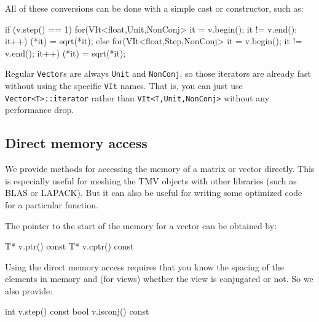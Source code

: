 \documentclass[twoside,letterpaper,11pt]{article}
\renewcommand{\tt}[1]{{\lstinline {#1}}}
\begin{document}
All of these conversions can be done with a simple cast or constructor, such as:
\begin{tmvcode}
if (v.step() == 1) {
    for(VIt<float,Unit,NonConj> it = v.begin(); it != v.end(); it++)
        (*it) = sqrt(*it);
} else {
    for(VIt<float,Step,NonConj> it = v.begin(); it != v.end(); it++)
        (*it) = sqrt(*it);
}
\end{tmvcode}

Regular \tt{Vector}s are always \tt{Unit} and \tt{NonConj}, so those iterators
are already fast without using the specific \tt{VIt} names. 
That is, you can just use \tt{Vector<T>::iterator} rather than \tt{VIt<T,Unit,NonConj>}
without any performance drop.

\subsection{Direct memory access}
\label{DirectAccess}

We provide methods for accessing the memory of a matrix or vector directly.
This is especially useful for meshing the TMV objects with other libraries
(such as BLAS or LAPACK).  But it can also be useful for writing some
optimized code for a particular function.  

The pointer to the start of the memory for a vector can be obtained by:
\begin{tmvcode}
T* v.ptr()
const T* v.cptr() const
\end{tmvcode}

Using the direct memory access
requires that you know the spacing of the elements in memory and
(for views) whether the view is conjugated or not.  So we also provide:
\begin{tmvcode}
int v.step() const
bool v.isconj() const
\end{tmvcode}
\end{document}
